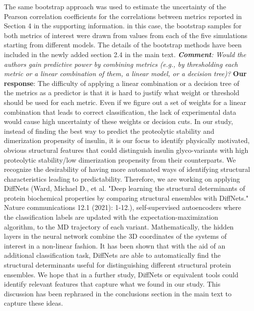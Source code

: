 \documentclass[sn-vancouver]{sn-jnl}
\begin{document}
\newline
\indent
The same bootstrap approach was used to estimate the uncertainty of the Pearson correlation coefficients for the correlations between metrics reported in Section 4 in the supporting information. in this case, the bootstrap samples for both metrics of interest were drawn from values from each of the five simulations starting from different models. The details of the bootstrap methods have been included in the newly added section 2.4 in the main text. 
\newline
\newline
\indent
\textit{\textbf{Comment}:
Would the authors gain predictive power by combining metrics (e.g., by thresholding each metric or a linear combination of them, a linear model, or a decision tree)? }
\newline
\indent 
{\bf Our response}: 
The difficulty of applying a linear combination or a decision tree of the metrics as a predictor is that it is hard to justify what weight or threshold should be used for each metric. Even if we figure out a set of weights for a linear combination that leads to correct classification, the lack of experimental data would cause high uncertainty of these weights or decision cuts. In our study, instead of finding the best way to predict the proteolytic stability and dimerization propensity of insulin, it is our focus to identify physically motivated, obvious structural features that could distinguish insulin glyco-variants with high proteolytic stability/low dimerization propensity from their counterparts. 
\newline
\indent
We recognize the desirability of having more automated ways of identifying structural characteristics leading to predictability. Therefore, we are working on applying DiffNets (Ward, Michael D., et al. "Deep learning the structural determinants of protein biochemical properties by comparing structural ensembles with DiffNets." Nature communications 12.1 (2021): 1-12.), self-supervised autoencoders where the classification labels are updated with the expectation-maximization algorithm, to the MD trajectory of each variant. Mathematically, the hidden layers in the neural network combine the 3D coordinates of the systems of interest in a non-linear fashion. It has been shown that with the aid of an additional classification task, DiffNets are able to automatically find the structural determinants useful for distinguishing different structural protein ensembles. We hope that in a further study, DiffNets or equivalent tools could identify relevant features that capture what we found in our study. This discussion has been rephrased in the conclusions section in the main text to capture these ideas.
\end{document}
